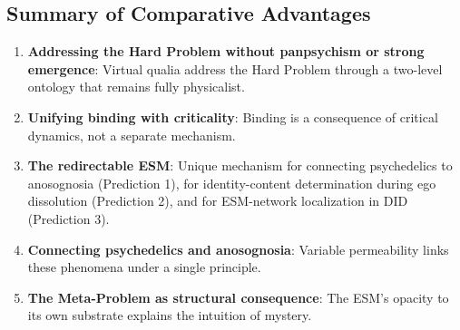 \documentclass[12pt]{article}
\begin{document}
\subsection{Summary of Comparative Advantages}


\begin{enumerate}
\item \textbf{Addressing the Hard Problem without panpsychism or strong emergence}: Virtual qualia address the Hard Problem through a two-level ontology that remains fully physicalist.
\item \textbf{Unifying binding with criticality}: Binding is a consequence of critical dynamics, not a separate mechanism.
\item \textbf{The redirectable ESM}: Unique mechanism for connecting psychedelics to anosognosia (Prediction 1), for identity-content determination during ego dissolution (Prediction 2), and for ESM-network localization in DID (Prediction 3).
\item \textbf{Connecting psychedelics and anosognosia}: Variable permeability links these phenomena under a single principle.
\item \textbf{The Meta-Problem as structural consequence}: The ESM's opacity to its own substrate explains the intuition of mystery.
\end{enumerate}
\end{document}
